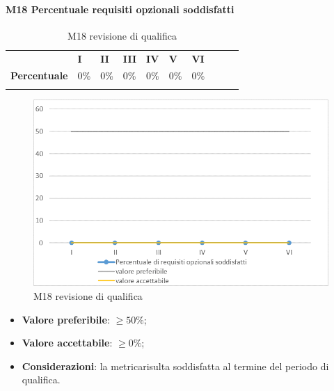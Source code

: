 \paragraph{M18 Percentuale requisiti opzionali soddisfatti} \mbox{}
\begin{longtable}[H!] {						
		>{}p{50mm}  		
		>{}p{8mm}
		>{}p{8mm}		
		>{}p{8mm}		
		>{}p{8mm}		
		>{}p{8mm}		
		>{}p{8mm}
		>{}p{8mm}
		>{}p{8mm}
		>{}p{8mm}
	}
	\rowcolor{gray!50}
	\textbf{} & \textbf{I} & \textbf{II} & \textbf{III} & \textbf{IV} & \textbf{V} & \textbf{VI} \TBstrut \\ [2mm]
	\textbf{Percentuale} & 0\% & 0\% & 0\% & 0\% & 0\% & 0\% \TBstrut \\ [2mm]
	\rowcolor{white}
	\caption{M18 revisione di qualifica}
\end{longtable}
\begin{figure}[H] 	
	\includegraphics[width=\linewidth]{./img/grafici/RQ18.png}	
	\caption{M18 revisione di qualifica}	
\end{figure}
\begin{itemize}
	\item \textbf{Valore preferibile}: $\ge 50\%$;
	\item \textbf{Valore accettabile}: $\ge 0\%$;
	\item \textbf{Considerazioni}: la metrica\glosp risulta soddisfatta al termine del periodo di qualifica.
\end{itemize}

